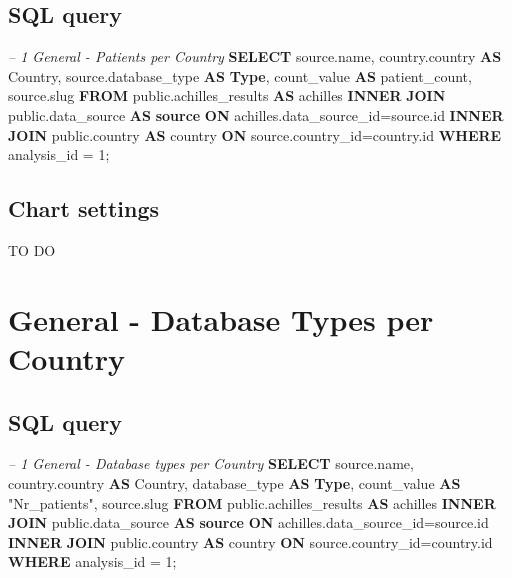 \documentclass[]{book}
\newenvironment{Shaded}{\begin{snugshade}}{\end{snugshade}}
\newcommand{\KeywordTok}[1]{\textcolor[rgb]{0.13,0.29,0.53}{\textbf{#1}}}
\newcommand{\DecValTok}[1]{\textcolor[rgb]{0.00,0.00,0.81}{#1}}
\newcommand{\CommentTok}[1]{\textcolor[rgb]{0.56,0.35,0.01}{\textit{#1}}}
\newcommand{\OtherTok}[1]{\textcolor[rgb]{0.56,0.35,0.01}{#1}}
\newcommand{\NormalTok}[1]{#1}
\begin{document}
\subsection{SQL query}\label{sql-query-5}

\begin{Shaded}
\begin{Highlighting}[]
\CommentTok{-- 1    General - Patients per Country}
\KeywordTok{SELECT}\NormalTok{ source.name,}
\NormalTok{       country.country }\KeywordTok{AS}\NormalTok{ Country,}
\NormalTok{       source.database_type }\KeywordTok{AS} \KeywordTok{Type}\NormalTok{,}
\NormalTok{       count_value }\KeywordTok{AS}\NormalTok{ patient_count,}
\NormalTok{       source.slug}
\KeywordTok{FROM}\NormalTok{ public.achilles_results }\KeywordTok{AS}\NormalTok{ achilles }
    \KeywordTok{INNER} \KeywordTok{JOIN}\NormalTok{ public.data_source }\KeywordTok{AS} \KeywordTok{source} \KeywordTok{ON} 
\NormalTok{      achilles.data_source_id=source.id}
    \KeywordTok{INNER} \KeywordTok{JOIN}\NormalTok{ public.country }\KeywordTok{AS}\NormalTok{ country }\KeywordTok{ON} 
\NormalTok{      source.country_id=country.id}
\KeywordTok{WHERE}\NormalTok{ analysis_id = }\DecValTok{1}\NormalTok{;}
\end{Highlighting}
\end{Shaded}

\subsection{Chart settings}\label{chart-settings-5}

TO DO

\section{General - Database Types per
Country}\label{general---database-types-per-country}

\subsection{SQL query}\label{sql-query-6}

\begin{Shaded}
\begin{Highlighting}[]
\CommentTok{-- 1    General - Database types per Country}
\KeywordTok{SELECT}\NormalTok{ source.name, }
\NormalTok{       country.country }\KeywordTok{AS}\NormalTok{ Country, }
\NormalTok{       database_type }\KeywordTok{AS} \KeywordTok{Type}\NormalTok{,}
\NormalTok{       count_value }\KeywordTok{AS} \OtherTok{"Nr_patients"}\NormalTok{,}
\NormalTok{       source.slug}
\KeywordTok{FROM}\NormalTok{ public.achilles_results }\KeywordTok{AS}\NormalTok{ achilles }
    \KeywordTok{INNER} \KeywordTok{JOIN}\NormalTok{ public.data_source }\KeywordTok{AS} \KeywordTok{source} \KeywordTok{ON} 
\NormalTok{      achilles.data_source_id=source.id}
    \KeywordTok{INNER} \KeywordTok{JOIN}\NormalTok{ public.country }\KeywordTok{AS}\NormalTok{ country }\KeywordTok{ON} 
\NormalTok{      source.country_id=country.id}
\KeywordTok{WHERE}\NormalTok{ analysis_id = }\DecValTok{1}\NormalTok{;}
\end{Highlighting}
\end{Shaded}
\end{document}
